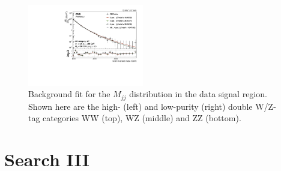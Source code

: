\begin{figure}[h!]
\includegraphics[width=0.45\textwidth]{figures/analysis/search2/AN-16-235/plots/ZZLP.pdf}
\caption{Background fit for the $M_{jj}$ distribution in the data signal region. Shown here are the high- (left) and low-purity (right) double W/Z-tag categories WW (top), WZ (middle) and ZZ (bottom).}
\label{fig:bkgfit_sr_vv}
\end{figure}



\clearpage
\chapter{Search III}
\vspace*{\fill}\newpage
\label{app:search3}

